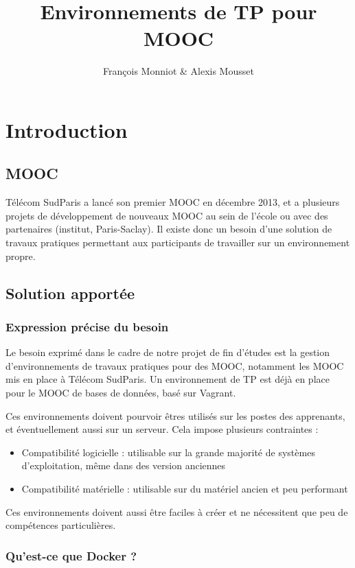\documentclass[a4paper,11pt]{report}
\title{Environnements de TP pour MOOC}
\author{François Monniot \& Alexis Mousset}
\begin{document}
\maketitle
\tableofcontents


\thispagestyle{fancy}
\chapter{Introduction}
\thispagestyle{fancy}
\section{MOOC}

Télécom SudParis a lancé son premier MOOC en décembre 2013, et a plusieurs projets de développement de nouveaux MOOC au sein de l'école ou avec des partenaires (institut, Paris-Saclay). Il existe donc un besoin d'une solution de travaux pratiques permettant aux participants de travailler sur un environnement propre.

\section{Solution apportée}

\subsection{Expression précise du besoin}

Le besoin exprimé dans le cadre de notre projet de fin d'études est la gestion d'environnements de travaux pratiques pour des MOOC, notamment les MOOC mis en place à Télécom SudParis. Un environnement de TP est déjà en place pour le MOOC de bases de données, basé sur Vagrant.

Ces environnements doivent pourvoir êtres utilisés sur les postes des apprenants, et éventuellement aussi sur un serveur. Cela impose plusieurs contraintes :
\begin{itemize}
  \item Compatibilité logicielle : utilisable sur la grande majorité de systèmes d'exploitation, même dans des version anciennes
  \item Compatibilité matérielle : utilisable sur du matériel ancien et peu performant
\end{itemize}

Ces environnements doivent aussi être faciles à créer et ne nécessitent que peu de compétences
particulières.

\subsection{Qu'est-ce que Docker ?}
\end{document}
